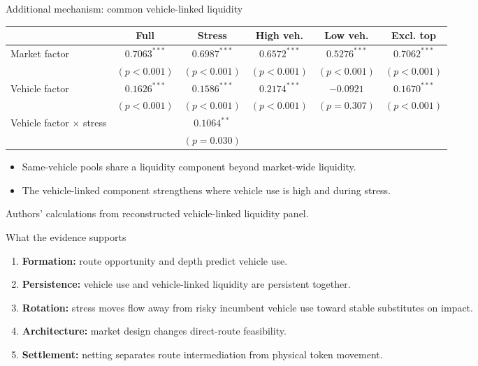 \documentclass[aspectratio=169,11pt]{beamer}
\newcommand{\source}[1]{\vfill {\tiny\textcolor{DVCGrey}{#1}}}
\newcommand{\key}[1]{\textcolor{DVCBlue}{\textbf{#1}}}
\begin{document}
\begin{frame}{Additional mechanism: common vehicle-linked liquidity}
\tiny
\begin{tabular}{lccccc}
\toprule
 & Full & Stress & High veh. & Low veh. & Excl. top \\
\midrule
Market factor & $0.7063^{***}$ & $0.6987^{***}$ & $0.6572^{***}$ & $0.5276^{***}$ & $0.7062^{***}$ \\
 & $(p<0.001)$ & $(p<0.001)$ & $(p<0.001)$ & $(p<0.001)$ & $(p<0.001)$ \\
Vehicle factor & $0.1626^{***}$ & $0.1586^{***}$ & $0.2174^{***}$ & $-0.0921$ & $0.1670^{***}$ \\
 & $(p<0.001)$ & $(p<0.001)$ & $(p<0.001)$ & $(p=0.307)$ & $(p<0.001)$ \\
Vehicle factor $\times$ stress & & $0.1064^{**}$ & & & \\
 & & $(p=0.030)$ & & & \\
\bottomrule
\end{tabular}
\vspace{0.8em}
\begin{itemize}
  \item Same-vehicle pools share a liquidity component beyond market-wide liquidity.
  \item The vehicle-linked component strengthens where vehicle use is high and during stress.
\end{itemize}
\source{Authors' calculations from reconstructed vehicle-linked liquidity panel.}
\end{frame}

\begin{frame}{What the evidence supports}
\begin{enumerate}
  \item \key{Formation:} route opportunity and depth predict vehicle use.
  \item \key{Persistence:} vehicle use and vehicle-linked liquidity are persistent together.
  \item \key{Rotation:} stress moves flow away from risky incumbent vehicle use toward stable substitutes on impact.
  \item \key{Architecture:} market design changes direct-route feasibility.
  \item \key{Settlement:} netting separates route intermediation from physical token movement.
\end{enumerate}
\end{frame}
\end{document}
